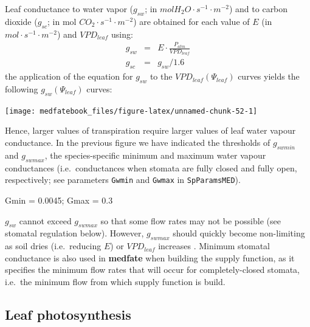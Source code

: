 \documentclass[]{book}
\newenvironment{Shaded}{\begin{snugshade}}{\end{snugshade}}
\newcommand{\FloatTok}[1]{\textcolor[rgb]{0.00,0.00,0.81}{#1}}
\newcommand{\StringTok}[1]{\textcolor[rgb]{0.31,0.60,0.02}{#1}}
\newcommand{\NormalTok}[1]{#1}
\begin{document}
Leaf conductance to water vapor (\(g_{sw}\); in \(mol H_2O \cdot s^{-1} \cdot m^{-2}\)) and to carbon dioxide (\(g_{sc}\); in mol \(CO_{2} \cdot s^{-1} \cdot m^{-2}\)) are obtained for each value of \(E\) (in \(mol \cdot s^{-1} \cdot m^{-2}\)) and \(VPD_{leaf}\) using:
\begin{eqnarray}
g_{sw} &=& E \cdot \frac{P_{atm}}{VPD_{leaf}}\\
g_{sc} &=& g_{sw}/1.6
\end{eqnarray}
the application of the equation for \(g_{sw}\) to the \(VPD_{leaf}(\Psi_{leaf})\) curves yields the following \(g_{sw}(\Psi_{leaf})\) curves:

\begin{center}\texttt{[image: medfatebook\_files/figure-latex/unnamed-chunk-52-1]} \end{center}

Hence, larger values of transpiration require larger values of leaf water vapour conductance. In the previous figure we have indicated the thresholds of \(g_{swmin}\) and \(g_{swmax}\), the species-specific minimum and maximum water vapour conductances (i.e.~conductances when stomata are fully closed and fully open, respectively; see parameters \texttt{Gwmin} and \texttt{Gwmax} in \texttt{SpParamsMED}).

\begin{Shaded}
\begin{Highlighting}[]
\NormalTok{Gmin =}\StringTok{ }\FloatTok{0.0045}\NormalTok{;}
\NormalTok{Gmax =}\StringTok{ }\FloatTok{0.3}
\end{Highlighting}
\end{Shaded}

\(g_{sw}\) cannot exceed \(g_{swmax}\) so that some flow rates may not be possible (see stomatal regulation below). However, \(g_{swmax}\) should quickly become non-limiting as soil dries (i.e.~reducing \(E\)) or \(VPD_{leaf}\) increases \citep{Sperry2016}. Minimum stomatal conductance is also used in \textbf{medfate} when building the supply function, as it specifies the minimum flow rates that will occur for completely-closed stomata, i.e.~the minimum flow from which supply function is build.

\hypertarget{leaf-photosynthesis}{%
\subsection{Leaf photosynthesis}\label{leaf-photosynthesis}}
\end{document}
